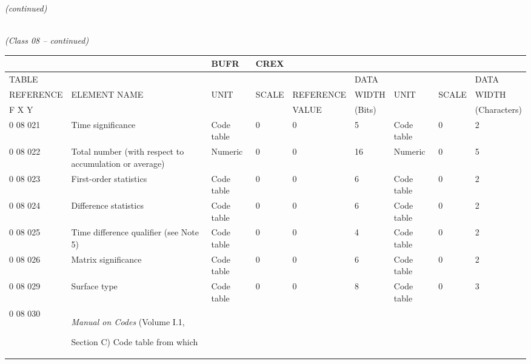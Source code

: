 \emph{(continued)}

\emph{\\
(Class 08 -- continued)}

\begin{longtable}[]{@{}lllllllll@{}}
\toprule
& & BUFR & CREX & & & & &\tabularnewline
\midrule
\endhead
TABLE & & & & & DATA & & & DATA\tabularnewline
REFERENCE & ELEMENT NAME & UNIT & SCALE & REFERENCE & WIDTH & UNIT & SCALE & WIDTH\tabularnewline
F X Y & & & & VALUE & (Bits) & & & (Characters)\tabularnewline
0 08 021 & Time significance & Code table & 0 & 0 & 5 & Code table & 0 & 2\tabularnewline
0 08 022 & Total number (with respect to accumulation or average) & Numeric & 0 & 0 & 16 & Numeric & 0 & 5\tabularnewline
0 08 023 & First-order statistics & Code table & 0 & 0 & 6 & Code table & 0 & 2\tabularnewline
0 08 024 & Difference statistics & Code table & 0 & 0 & 6 & Code table & 0 & 2\tabularnewline
0 08 025 & Time difference qualifier (see Note 5) & Code table & 0 & 0 & 4 & Code table & 0 & 2\tabularnewline
0 08 026 & Matrix significance & Code table & 0 & 0 & 6 & Code table & 0 & 2\tabularnewline
0 08 029 & Surface type & Code table & 0 & 0 & 8 & Code table & 0 & 3\tabularnewline
\begin{minipage}[t]{0.08\columnwidth}\raggedright
0 08 030\strut
\end{minipage} & \begin{minipage}[t]{0.08\columnwidth}\raggedright
\emph{Manual on Codes} (Volume I.1,

Section C) Code table from which


\end{minipage}
\end{longtable}

